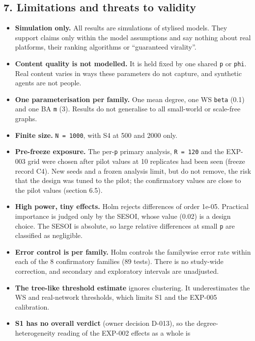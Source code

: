 \documentclass[
]{article}
\providecommand{\tightlist}{%
  \setlength{\itemsep}{0pt}\setlength{\parskip}{0pt}}
\begin{document}
\subsection{7. Limitations and threats to
validity}\label{limitations-and-threats-to-validity}

\begin{itemize}
\tightlist
\item
  \textbf{Simulation only.} All results are simulations of stylised
  models. They support claims only within the model assumptions and say
  nothing about real platforms, their ranking algorithms or ``guaranteed
  virality''.
\item
  \textbf{Content quality is not modelled.} It is held fixed by one
  shared \texttt{p} or \texttt{phi}. Real content varies in ways these
  parameters do not capture, and synthetic agents are not people.
\item
  \textbf{One parameterisation per family.} One mean degree, one WS
  \texttt{beta} (0.1) and one BA \texttt{m} (3). Results do not
  generalise to all small-world or scale-free graphs.
\item
  \textbf{Finite size.} \texttt{N\ =\ 1000}, with S4 at 500 and 2000
  only.
\item
  \textbf{Pre-freeze exposure.} The per-\texttt{p} primary analysis,
  \texttt{R\ =\ 120} and the EXP-003 grid were chosen after pilot values
  at 10 replicates had been seen (freeze record C4). New seeds and a
  frozen analysis limit, but do not remove, the risk that the design was
  tuned to the pilot; the confirmatory values are close to the pilot
  values (section 6.5).
\item
  \textbf{High power, tiny effects.} Holm rejects differences of order
  1e-05. Practical importance is judged only by the SESOI, whose value
  (0.02) is a design choice. The SESOI is absolute, so large relative
  differences at small \texttt{p} are classified as negligible.
\item
  \textbf{Error control is per family.} Holm controls the familywise
  error rate within each of the 8 confirmatory families (89 tests).
  There is no study-wide correction, and secondary and exploratory
  intervals are unadjusted.
\item
  \textbf{The tree-like threshold estimate} ignores clustering. It
  underestimates the WS and real-network thresholds, which limits S1 and
  the EXP-005 calibration.
\item
  \textbf{S1 has no overall verdict} (owner decision D-013), so the
  degree-heterogeneity reading of the EXP-002 effects as a whole is

\end{itemize}
\end{document}
